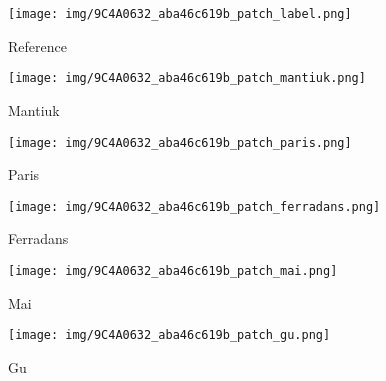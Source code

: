 \documentclass[journal]{IEEEtran}
\begin{document}
\begin{figure*}[t]
        \centering
        \begin{subfigure}[b]{0.24\textwidth}  
            \centering 
            \texttt{[image: img/9C4A0632\_aba46c619b\_patch\_label.png]}
            \caption[]%
            {{\small Reference }}    
            \label{fig:mean and std of net24}
        \end{subfigure}
        \begin{subfigure}[b]{0.24\textwidth}  
            \centering 
            \texttt{[image: img/9C4A0632\_aba46c619b\_patch\_mantiuk.png]}
            \caption[]%
            {{\small Mantiuk \cite{mantiuk2008display} }}    
            \label{fig:mean and std of net24}
        \end{subfigure}
        \begin{subfigure}[b]{0.24\textwidth}   
            \centering 
            \texttt{[image: img/9C4A0632\_aba46c619b\_patch\_paris.png]}
            \caption[]%
            {{\small Paris \cite{paris2015local} }}    
            \label{fig:mean and std of net34}
        \end{subfigure}
        \begin{subfigure}[b]{0.24\textwidth}   
            \centering 
            \texttt{[image: img/9C4A0632\_aba46c619b\_patch\_ferradans.png]}
            \caption[]%
            {{\small Ferradans \cite{ferradans2011analysis}     }}    
            \label{fig:mean and std of net44}
        \end{subfigure}
        \label{fig:mean and std of nets}
        \centering
        \begin{subfigure}[b]{0.24\textwidth}
            \centering
            \texttt{[image: img/9C4A0632\_aba46c619b\_patch\_mai.png]}
            \caption[]%
            {{\small Mai \cite{mai2011optimizing} }}    
            \label{fig:mean and std of net14}
        \end{subfigure}
        \begin{subfigure}[b]{0.24\textwidth}
            \centering
            \texttt{[image: img/9C4A0632\_aba46c619b\_patch\_gu.png]}
            \caption[]%
            {{\small Gu \cite{gu2013local} }}    
            \label{fig:mean and std of net14}

\end{subfigure}
\end{figure*}
\end{document}
